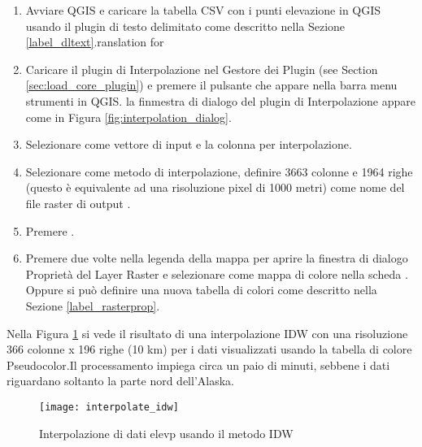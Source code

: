 \begin{enumerate}
  \item Avviare QGIS e caricare la  tabella CSV con i punti elevazione in QGIS usando il plugin di testo delimitato come descritto nella Sezione \ref{label_dltext}.ranslation for 
  \item Caricare il plugin di Interpolazione nel Gestore dei Plugin (see Section 
  \ref{sec:load_core_plugin}) e premere il pulsante  che appare nella barra menu strumenti in QGIS. la finmestra di dialogo del plugin di Interpolazione appare come in Figura \ref{fig:interpolation_dialog}.
  \item Selezionare  come vettore di input e la colonna  per interpolazione.
  \item Selezionare  come metodo di interpolazione, definire 
  3663 colonne e 1964 righe (questo è equivalente ad una risoluzione pixel di 1000 metri) come nome del file raster di output .
  \item Premere .
  \item Premere due volte  nella legenda della mappa per aprire la finestra di dialogo Proprietà del Layer Raster e selezionare  come mappa di colore nella scheda . Oppure 
  si può definire una nuova tabella di colori come descritto nella Sezione \ref{label_rasterprop}.
\end{enumerate}

Nella Figura \ref{fig:interpolation_idw} si vede il risultato di una interpolazione IDW con una risoluzione 366 colonne x 196 righe (10 km) per i dati  visualizzati usando la tabella di colore Pseudocolor.Il processamento impiega circa un paio di minuti, sebbene i dati riguardano soltanto la parte nord dell'Alaska.

\begin{figure}[ht]
   \begin{center}
   \caption{Interpolazione di dati elevp usando il metodo IDW \nixcaption}\label{fig:interpolation_idw}\smallskip
   \texttt{[image: interpolate\_idw]}
\end{center}  
\end{figure}

\newpage



